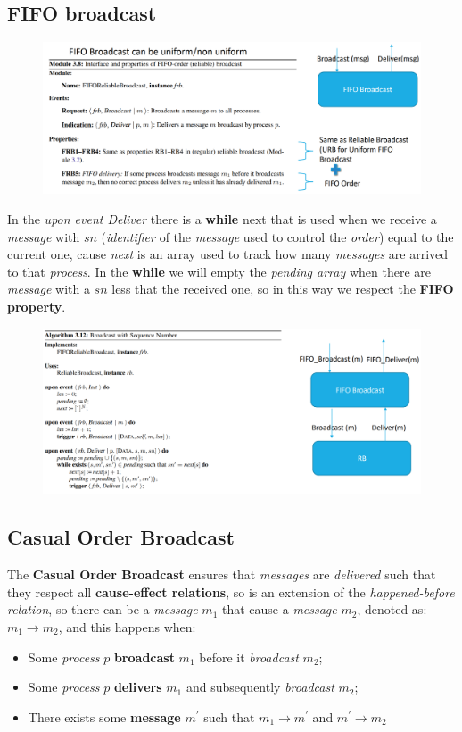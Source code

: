 \documentclass{article}
\begin{document}
\subsection{FIFO broadcast}
\begin{figure}[H]
  \centering
  \includegraphics[scale=0.7,left]{cattura48.png}
\end{figure}
In the \emph{upon event Deliver} there is a \textbf{while} next that is used when we receive a \emph{message} with $sn$ (\emph{identifier} of the \emph{message} used to control the \emph{order}) equal to the current one, cause \emph{next} is an array used to track how many \emph{messages} are arrived to that \emph{process}. In the \textbf{while} we will empty the \emph{pending array} when there are \emph{message} with a $sn$ less that the received one, so in this way we respect the \textbf{FIFO property}.
\begin{figure}[H]
  \centering
  \includegraphics[scale=0.7,left]{cattura49.png}
\end{figure}

\subsection{Casual Order Broadcast}
The \textbf{Casual Order Broadcast} ensures that \emph{messages} are \emph{delivered} such that they respect all \textbf{cause-effect relations}, so is an extension of the \emph{happened-before relation}, so there can be a \emph{message} $m_1$ that cause a \emph{message} $m_2$, denoted as: $m_1 \rightarrow m_2$, and this happens when:
\begin{itemize}
\item Some \emph{process} $p$ \textbf{broadcast} $m_1$ before it \emph{broadcast} $m_2$;
\item Some \emph{process} $p$ \textbf{delivers} $m_1$ and subsequently \emph{broadcast} $m_2$;
\item There exists some \textbf{message} $m^{'}$ such that $m_1 \rightarrow m^{'}$ and $m^{'} \rightarrow m_2$
\end{itemize}
\end{document}

